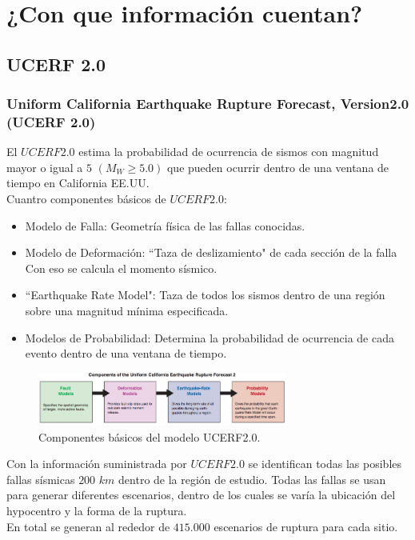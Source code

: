 \documentclass{beamer}
\begin{document}
\section{¿Con que información cuentan?}
\subsection{UCERF 2.0}
\begin{frame}[allowframebreaks]
\frametitle{Uniform California Earthquake Rupture Forecast, Version2.0 (UCERF 2.0)}
%
\justifying
El $UCERF2.0$ estima la probabilidad de ocurrencia de sismos con magnitud mayor o igual a $5$ $(M_W \geq 5.0)$ que pueden ocurrir dentro de una ventana de tiempo en California EE.UU.\\
%
Cuantro componentes básicos de $UCERF2.0$:
%
	\begin{itemize}
	\justifying
		\item Modelo de Falla: Geometría física de las fallas conocidas.
		\item Modelo de Deformación: ``Taza de deslizamiento" de cada sección de la falla Con eso se calcula el momento sísmico.
		\item ``Earthquake Rate Model": Taza de todos los sismos dentro de una región sobre una magnitud mínima especificada.
		\item Modelos de Probabilidad: Determina la probabilidad de ocurrencia de cada evento dentro de una ventana de tiempo.
	\end{itemize}
%
\begin{figure}[h]
	\centering
	\includegraphics[height=1.75cm]{img/Components_UCERF.png}
	\caption{Componentes básicos del modelo UCERF2.0. \cite[figura 3, página 2057]{gravesetal}}
\end{figure}
%
%
Con la información suministrada por $UCERF2.0$ se identifican todas las posibles fallas sísmicas $200$ $km$ dentro de la región de estudio. Todas las fallas se usan para generar diferentes escenarios, dentro de los cuales se varía la ubicación del hypocentro y la forma de la ruptura.\\
%
En total se generan al rededor de $415.000$ escenarios de ruptura para cada sitio. 
%
%
\end{frame}
%
%
\end{document}
